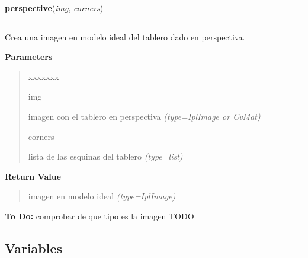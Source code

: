 \hspace{.8\funcindent}\begin{boxedminipage}{\funcwidth}

    \raggedright \textbf{perspective}(\textit{img}, \textit{corners})

    \vspace{-1.5ex}

    \rule{\textwidth}{0.5\fboxrule}
\setlength{\parskip}{2ex}
Crea una imagen en modelo ideal del tablero dado en perspectiva.

\setlength{\parskip}{1ex}
      \textbf{Parameters}
      \vspace{-1ex}

      \begin{quote}
        \begin{Ventry}{xxxxxxx}

          \item[img]


imagen con el tablero en perspectiva
            {\it (type=IplImage or CvMat)}

          \item[corners]


lista de las esquinas del tablero
            {\it (type=list)}

        \end{Ventry}

      \end{quote}

      \textbf{Return Value}
    \vspace{-1ex}

      \begin{quote}

imagen en modelo ideal
      {\it (type=IplImage)}

      \end{quote}

\textbf{To Do:} 
comprobar de que tipo es la imagen TODO


    \end{boxedminipage}



  \subsection{Variables}

